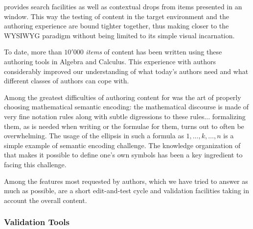 {} provides search facilities as well as contextual drops from items
presented in an {\activemath} window.  This way the testing of content in the target
environment and the authoring experience are bound tighter together,
thus making {} closer to the WYSIWYG paradigm without being limited to
its simple visual incarnation.


To date, more than $10'000$ {\emph{items}} of {\omdoc} content has been written using
these authoring tools in Algebra and Calculus. This experience with authors considerably
improved our understanding of what today's authors need and what different classes of
authors can cope with.


Among the greatest difficulties of authoring content for {\activemath} was the art of
properly choosing mathematical semantic encoding: the mathematical discourse is made of
very fine notation rules along with subtle digressions to these rules...  formalizing
them, as is needed when writing {\openmath} or the {\qmath} formulae for them, turns out
to often be overwhelming.  The usage of the ellipsis in such a formula as $1, \dots, k,
\dots, n$ is a simple example of semantic encoding challenge. The knowledge organization
of {\omdoc} that makes it possible to define one's own {\openmath} symbols has been a key
ingredient to facing this challenge.

Among the features most requested by authors, which we have tried to answer 
as much as possible,  are a short edit-and-test cycle and validation facilities 
taking in account the overall content.

\subsubsection{Validation Tools}

